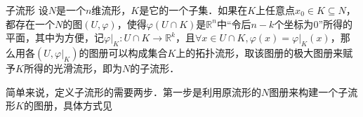 

\begin{definition}{子流形}\label{SubMnf_def1}
设$N$是一个$n$维流形，$K$是它的一个子集．如果在$K$上任意点$x_0\in K\subseteq N$，都存在一个$N$的图$(U, \varphi)$，使得$\varphi (U\cap K)$是$\mathbb{R}^n$中“令后$n-k$个坐标为$0$”所得的平面，其中为方便，记$\varphi|_K:U\cap K\rightarrow\mathbb{R}^k$，且$\forall x\in U\cap K, \varphi(x)=\varphi|_K(x)$，那么用各$(U, \varphi|_K)$的图册可以构成集合$K$上的拓扑流形，取该图册的极大图册来赋予$K$所得的光滑流形，即为$N$的子流形．
\end{definition}

简单来说，定义子流形的需要两步．第一步是利用原流形的$N$图册来构建一个子流形$K$的图册，具体方式见




